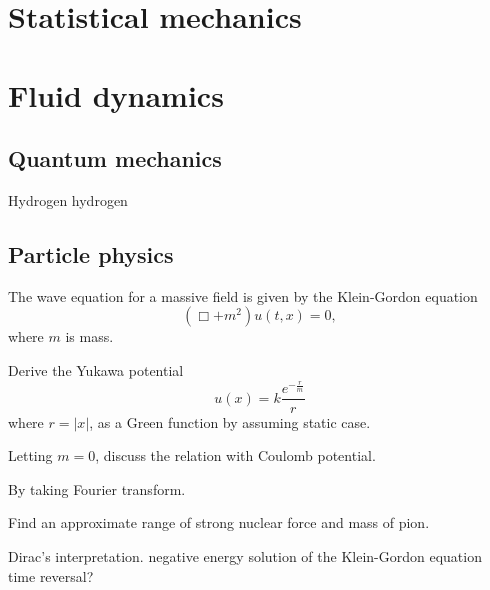 \documentclass{../prb}
\begin{document}
\chapter{Statistical mechanics}

\chapter{Fluid dynamics}



\section{Quantum mechanics}
\begin{prb}
Hydrogen
\q hydrogen
\end{prb}


\section{Particle physics}
\begin{prb}
The wave equation for a massive field is given by the Klein-Gordon equation
\[(\Box+m^2)u(t,x)=0,\]
where $m$ is mass.
\begin{cond}
\item Derive the Yukawa potential\[u(x)=k\frac{e^{-\frac rm}}r\]where $r=|x|$, as a Green function by assuming static case.
\item Letting $m=0$, discuss the relation with Coulomb potential.
\item By taking Fourier transform.
\item Find an approximate range of strong nuclear force and mass of pion.
\end{cond}
\end{prb}

\begin{prb}
Dirac's interpretation.
\q negative energy solution of the Klein-Gordon equation
\q time reversal?
\end{prb}

\begin{prb}
\end{prb}

\begin{prb}
\end{prb}
\end{document}
